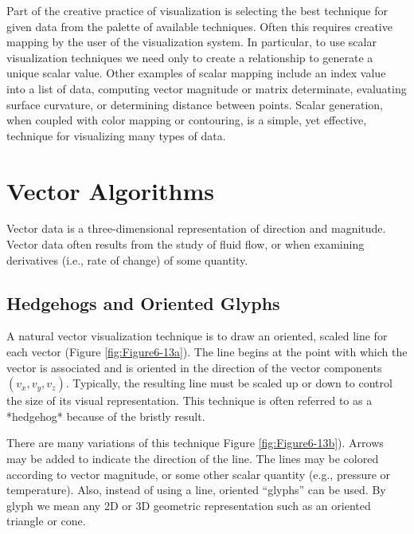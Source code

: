 Part of the creative practice of visualization is selecting the best technique for given data from the palette of available techniques. Often this requires creative mapping by the user of the visualization system. In particular, to use scalar visualization techniques we need only to create a relationship to generate a unique scalar value. Other examples of scalar mapping include an index value into a list of data, computing vector magnitude or matrix determinate, evaluating surface curvature, or determining distance between points. Scalar generation, when coupled with color mapping or contouring, is a simple, yet effective, technique for visualizing many types of data.

\section{Vector Algorithms}

Vector data is a three-dimensional representation of direction and magnitude. Vector data often results from the study of fluid flow, or when examining derivatives (i.e., rate of change) of some quantity.

\subsection{Hedgehogs and Oriented Glyphs}
\label{subsec:hedgehogs_oriented_glyphs}

A natural vector visualization technique is to draw an oriented,
scaled line for each vector (Figure \ref{fig:Figure6-13a}). The line begins at the point with which the vector is associated and is oriented in the direction of the vector components $(v_x, v_y, v_z)$. Typically, the resulting line must be scaled up or down to control the size of its visual representation. This technique is often referred to as a *hedgehog* because of the bristly result.

There are many variations of this technique Figure \ref{fig:Figure6-13b}). Arrows may be added to indicate the direction of the line. The lines may be colored according to vector magnitude, or some other scalar quantity (e.g., pressure or temperature). Also, instead of using a line, oriented ``glyphs'' can be used. By glyph we mean any 2D or 3D geometric representation such as an oriented triangle or cone.

